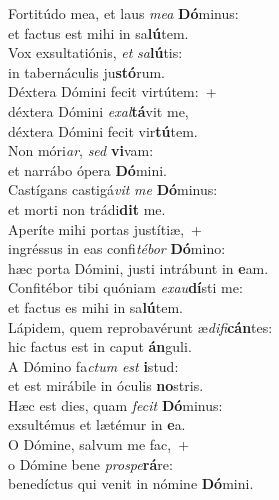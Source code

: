 \evenverse Fortitúdo mea, et laus \textit{me}\textit{a} \textbf{Dó}minus:~\*\\
\evenverse et factus est mihi in sa\textbf{lú}tem.\\
\oddverse Vox exsultatiónis, \textit{et} \textit{sa}\textbf{lú}tis:~\*\\
\oddverse in tabernáculis ju\textbf{stó}rum.\\
\evenverse Déxtera Dómini fecit virtútem:~+\\
\evenverse  déxtera Dómini \textit{e}\textit{xal}\textbf{tá}vit me,~\*\\
\evenverse déxtera Dómini fecit vir\textbf{tú}tem.\\
\oddverse Non móri\textit{ar}, \textit{sed} \textbf{vi}vam:~\*\\
\oddverse et narrábo ópera \textbf{Dó}mini.\\
\evenverse Castígans castigá\textit{vit} \textit{me} \textbf{Dó}minus:~\*\\
\evenverse et morti non trádi\textbf{dit} me.\\
\oddverse Aperíte mihi portas justítiæ,~+\\
\oddverse  ingréssus in eas confi\textit{té}\textit{bor} \textbf{Dó}mino:~\*\\
\oddverse hæc porta Dómini, justi intrábunt in \textbf{e}am.\\
\evenverse Confitébor tibi quóniam \textit{e}\textit{xau}\textbf{dí}sti me:~\*\\
\evenverse et factus es mihi in sa\textbf{lú}tem.\\
\oddverse Lápidem, quem reprobavérunt æ\textit{di}\textit{fi}\textbf{cán}tes:~\*\\
\oddverse hic factus est in caput \textbf{án}guli.\\
\evenverse A Dómino fa\textit{ctum} \textit{est} \textbf{i}stud:~\*\\
\evenverse et est mirábile in óculis \textbf{no}stris.\\
\oddverse Hæc est dies, quam \textit{fe}\textit{cit} \textbf{Dó}minus:~\*\\
\oddverse exsultémus et lætémur in \textbf{e}a.\\
\evenverse O Dómine, salvum me fac,~+\\
\evenverse  o Dómine bene \textit{pro}\textit{spe}\textbf{rá}re:~\*\\
\evenverse benedíctus qui venit in nómine \textbf{Dó}mini.\\

